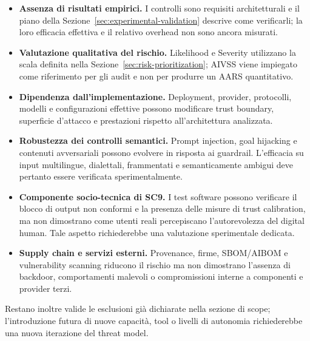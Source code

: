 \documentclass[11pt,a4paper]{article}
\begin{document}
\begin{itemize}

    \item \textbf{Assenza di risultati empirici.}
    I controlli sono requisiti architetturali e il piano della
    Sezione~\ref{sec:experimental-validation} descrive come verificarli;
    la loro efficacia effettiva e il relativo overhead non sono ancora
    misurati.

    \item \textbf{Valutazione qualitativa del rischio.}
    Likelihood e Severity utilizzano la scala definita nella
    Sezione~\ref{sec:risk-prioritization}; AIVSS viene impiegato come
    riferimento per gli audit e non per produrre un AARS quantitativo.

    \item \textbf{Dipendenza dall'implementazione.}
    Deployment, provider, protocolli, modelli e configurazioni effettive
    possono modificare trust boundary, superficie d'attacco e
    prestazioni rispetto all'architettura analizzata.

    \item \textbf{Robustezza dei controlli semantici.}
    Prompt injection, goal hijacking e contenuti avversariali possono
    evolvere in risposta ai guardrail. L'efficacia su input
    multilingue, dialettali, frammentati e semanticamente ambigui deve
    pertanto essere verificata sperimentalmente.

    \item \textbf{Componente socio-tecnica di SC9.}
    I test software possono verificare il blocco di output non conformi
    e la presenza delle misure di trust calibration, ma non dimostrano
    come utenti reali percepiscano l'autorevolezza del digital human.
    Tale aspetto richiederebbe una valutazione sperimentale dedicata.

    \item \textbf{Supply chain e servizi esterni.}
    Provenance, firme, SBOM/AIBOM e vulnerability scanning riducono il
    rischio ma non dimostrano l'assenza di backdoor, comportamenti
    malevoli o compromissioni interne a componenti e provider terzi.

\end{itemize}

Restano inoltre valide le esclusioni già dichiarate nella sezione di
scope; l'introduzione futura di nuove capacità, tool o livelli di
autonomia richiederebbe una nuova iterazione del threat model.


\end{document}
